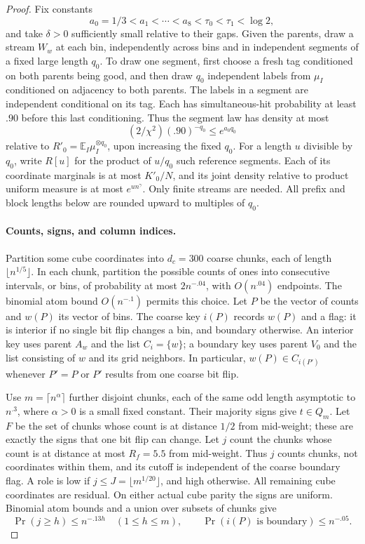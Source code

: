 \begin{proof}
Fix constants
\[
 a_0=1/3<a_1<\cdots<a_8<\tau_0<\tau_1<\log2,
\]
and take \(\delta>0\) sufficiently small relative to their gaps. Given
the parents, draw a stream \(W_w\) at each bin, independently across bins
and in independent segments of a fixed large length \(q_0\). To draw one
segment, first choose a fresh tag conditioned on both parents being good,
and then draw \(q_0\) independent labels from \(\mu_I\) conditioned on
adjacency to both parents. The labels in a segment are independent
conditional on its tag. Each has simultaneous-hit probability at least
\(.90\) before this last conditioning. Thus the segment law has density
at most
\[
 (2/\chi^2)(.90)^{-q_0}\le e^{a_0q_0}
\]
relative to \(R'_0=\mathbb E_I\mu_I^{\otimes q_0}\), upon increasing the
fixed \(q_0\). For a length \(u\) divisible by \(q_0\), write
\(R[u]\) for the product of \(u/q_0\) such reference segments. Each of
its coordinate marginals is at most \(K'_0/N\), and its joint density
relative to product uniform measure is at most \(e^{u n^\gamma}\).
Only finite streams are needed. All prefix and block lengths below are
rounded upward to multiples of \(q_0\).

\paragraph{Counts, signs, and column indices.}
Partition some cube coordinates into \(d_c=300\) coarse chunks, each of
length \(\lfloor n^{1/5}\rfloor\). In each chunk, partition the possible
counts of ones into consecutive intervals, or bins, of probability at
most \(2n^{-.04}\), with \(O(n^{.04})\) endpoints. The binomial atom
bound \(O(n^{-.1})\) permits this choice. Let \(P\) be the vector of
counts and \(w(P)\) its vector of bins. The coarse key \(i(P)\) records
\(w(P)\) and a flag: it is interior if no single bit flip changes a bin,
and boundary otherwise. An interior key uses parent \(A_w\) and the
list \(C_i=\{w\}\); a boundary key uses parent \(V_0\) and the list
consisting of \(w\) and its grid neighbors. In particular,
\(w(P)\in C_{i(P')}\) whenever \(P'=P\) or \(P'\) results from one
coarse bit flip.

Use \(m=\lceil n^\alpha\rceil\) further disjoint chunks, each of the
same odd length asymptotic to \(n^{.3}\), where \(\alpha>0\) is a small
fixed constant. Their majority signs give \(t\in Q_m\). Let \(F\) be
the set of chunks whose count is at distance \(1/2\) from mid-weight;
these are exactly the signs that one bit flip can change. Let \(j\)
count the chunks whose count is at distance at most \(R_f=5.5\) from
mid-weight. Thus \(j\) counts chunks, not coordinates within them, and
its cutoff is independent of the coarse boundary flag. A role is low if
\(j\le J=\lfloor m^{1/20}\rfloor\), and high otherwise. All remaining
cube coordinates are residual. On either actual cube parity the signs
are uniform. Binomial atom bounds and a union over subsets of chunks give
\[
 \Pr(j\ge h)\le n^{-.13h}\quad(1\le h\le m),\qquad
 \Pr(i(P)\text{ is boundary})\le n^{-.05}.
\]


\end{proof}
